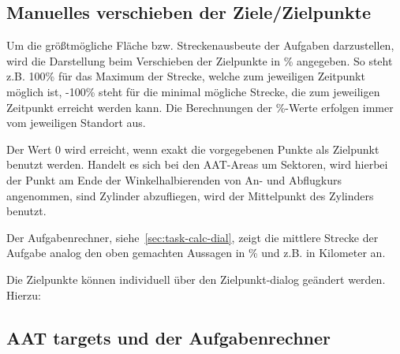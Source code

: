 \subsection*{Manuelles verschieben der Ziele/Zielpunkte}

Um die größtmögliche Fläche bzw. Streckenausbeute der Aufgaben darzustellen, wird die Darstellung beim Verschieben der Zielpunkte  in \% angegeben.  So steht z.B. 100\% für das Maximum der Strecke, welche zum jeweiligen Zeitpunkt möglich ist, -100\% steht für die minimal mögliche Strecke, die zum jeweiligen Zeitpunkt erreicht werden kann. Die Berechnungen der \%-Werte erfolgen immer vom jeweiligen Standort aus.

Der Wert 0 wird erreicht, wenn exakt die vorgegebenen Punkte als Zielpunkt benutzt werden.  Handelt es sich bei den AAT-Areas um Sektoren, wird hierbei der Punkt am Ende der Winkelhalbierenden von An- und Abflugkurs  angenommen, sind Zylinder abzufliegen, wird der Mittelpunkt des Zylinders benutzt.

Der Aufgabenrechner, siehe~\ref{sec:task-calc-dial}, zeigt die mittlere Strecke der Aufgabe analog den oben gemachten Aussagen in \% und z.B. in Kilometer an.

Die Zielpunkte können individuell über den Zielpunkt-dialog geändert werden. Hierzu:

\begin{quote}
\blink{}\blink{}
\end{quote}

\subsection*{AAT targets und der Aufgabenrechner}

